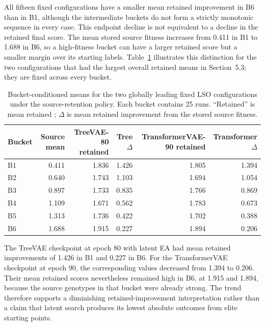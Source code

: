 All fifteen fixed configurations have a smaller mean retained improvement in B6 than in B1, although the intermediate buckets do not form a strictly monotonic sequence in every case. This endpoint decline is not equivalent to a decline in the retained final score. The mean stored source fitness increases from 0.411 in B1 to 1.688 in B6, so a high-fitness bucket can have a larger retained score but a smaller margin over its starting labels. Table~\ref{tab:lso-leading-buckets} illustrates this distinction for the two configurations that had the largest overall retained means in Section~5.3; they are fixed across every bucket.

\begin{table}[H]
\centering
\caption{Bucket-conditioned means for the two globally leading fixed LSO configurations under the source-retention policy. Each bucket contains 25 runs. ``Retained'' is mean retained \vertpos{}; $\Delta$ is mean retained improvement from the stored source fitness.}
\label{tab:lso-leading-buckets}
{\small
\setlength{\tabcolsep}{4.2pt}
\begin{tabular}{lrrrrr}
\hline
Bucket & Source mean & TreeVAE-80 retained & Tree $\Delta$ & TransformerVAE-90 retained & Transformer $\Delta$ \\
\hline
B1 & 0.411 & 1.836 & 1.426 & 1.805 & 1.394 \\
B2 & 0.640 & 1.743 & 1.103 & 1.694 & 1.054 \\
B3 & 0.897 & 1.733 & 0.835 & 1.766 & 0.869 \\
B4 & 1.109 & 1.671 & 0.562 & 1.783 & 0.673 \\
B5 & 1.313 & 1.736 & 0.422 & 1.702 & 0.388 \\
B6 & 1.688 & 1.915 & 0.227 & 1.894 & 0.206 \\
\hline
\end{tabular}}
\end{table}

The TreeVAE checkpoint at epoch 80 with latent EA had mean retained improvements of 1.426 in B1 and 0.227 in B6. For the TransformerVAE checkpoint at epoch 90, the corresponding values decreased from 1.394 to 0.206. Their mean retained scores nevertheless remained high in B6, at 1.915 and 1.894, because the source genotypes in that bucket were already strong. The trend therefore supports a diminishing retained-improvement interpretation rather than a claim that latent search produces its lowest absolute outcomes from elite starting points.

